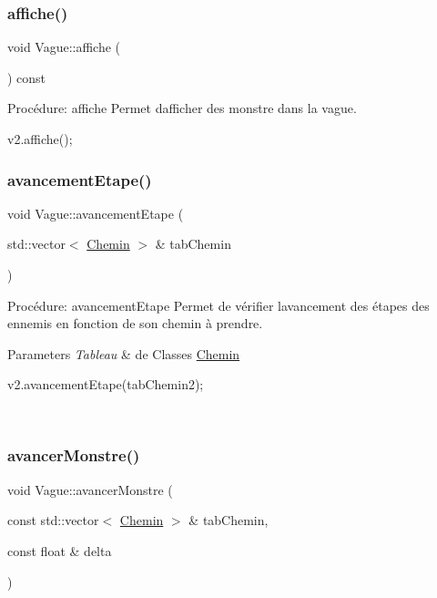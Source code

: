 \subsubsection{\texorpdfstring{affiche()}{affiche()}}
{\footnotesize\ttfamily void Vague\+::affiche (\begin{DoxyParamCaption}{ }\end{DoxyParamCaption}) const}



Procédure\+: affiche Permet d\textquotesingle{}afficher des monstre dans la vague. 


\begin{DoxyCode}
v2.affiche();
\end{DoxyCode}
 \mbox{\label{classVague_ab61cff7242c22ec90c6cb4858b5a0bc6}} 
\subsubsection{\texorpdfstring{avancement\+Etape()}{avancementEtape()}}
{\footnotesize\ttfamily void Vague\+::avancement\+Etape (\begin{DoxyParamCaption}\item[{std\+::vector$<$ \hyperlink{classChemin}{Chemin} $>$ \&}]{tab\+Chemin }\end{DoxyParamCaption})}



Procédure\+: avancement\+Etape Permet de vérifier l\textquotesingle{}avancement des étapes des ennemis en fonction de son chemin à prendre. 


\begin{DoxyParams}{Parameters}
{\em Tableau} & de Classes \hyperlink{classChemin}{Chemin} 
\begin{DoxyCode}
v2.avancementEtape(tabChemin2);
\end{DoxyCode}
 \\
\hline
\end{DoxyParams}
\mbox{\label{classVague_a4753f9895677bc4050fdf0c8fc90984b}} 
\subsubsection{\texorpdfstring{avancer\+Monstre()}{avancerMonstre()}}
{\footnotesize\ttfamily void Vague\+::avancer\+Monstre (\begin{DoxyParamCaption}\item[{const std\+::vector$<$ \hyperlink{classChemin}{Chemin} $>$ \&}]{tab\+Chemin,  }\item[{const float \&}]{delta }\end{DoxyParamCaption})}



